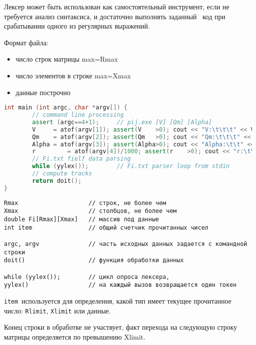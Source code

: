 \label{lexer}\secdown



\secdown

\begin{framed}
\noindent Лексер может быть использован как самостоятельный инструмент, если
не требуется анализ синтаксиса, и достаточно выполнять заданный \cpp\ код
при срабатывании одного из регулярных выражений.
\end{framed}


Формат файла: \bigskip

\begin{itemize}[nosep]
\item число строк матрицы max=Rmax
\item число элементов в строке max=Xmax
\item данные построчно
\end{itemize}


\begin{lstlisting}[language=c++]
int main (int argc, char *argv[]) {
        // command line processing
        assert (argc==4+1);     // pij.exe [V] [Qm] [Alpha]
        V     = atof(argv[1]); assert(V    >0); cout << "V:\t\t\t" << V << "\n";
        Qm    = atof(argv[2]); assert(Qm   >0); cout << "Qm:\t\t\t" << Qm << "\n";
        Alpha = atof(argv[3]); assert(Alpha>0); cout << "Alpha:\t\t" << Alpha << "\n";
        r         = atof(argv[4])/1000; assert(r    >0); cout << "r:\t\t\t" << r << "\n";
        // Fi.txt fielf data parsing
        while (yylex());        // Fi.txt parser loop from stdin
        // compute tracks
        return doit();
}
\end{lstlisting}

\begin{verbatim}
Rmax 					// строк, не более чем 
Xmax 					// столбцов, не более чем
double Fi[Rmax][Xmax]	// массив под данные
int item				// общий счетчик прочитанных чисел

argc, argv				// часть исходных данных задается с командной строки
doit()					// функция обработки данных

while (yylex());		// цикл опроса лексера,
yylex()					// на каждый вызов возвращается один токен
\end{verbatim}

\verb|item|\ используется для определения, какой тип имеет текущее 
прочитанное число: \verb|Rlimit|, \verb|Xlimit| или данные.

Конец строки в обработке не участвует, факт перехода на следующую строку
матрицы определяется по превышению Xlimit.

\secup
\secup